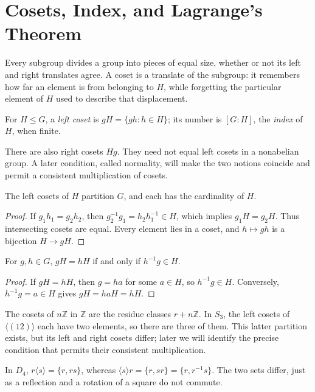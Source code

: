 \section{Cosets, Index, and Lagrange's Theorem}

Every subgroup divides a group into pieces of equal size, whether or not its
left and right translates agree.  A coset is a translate of the subgroup: it remembers
how far an element is from belonging to \(H\), while forgetting the particular
element of \(H\) used to describe that displacement.

For \(H\leq G\), a \emph{left coset} is \(gH=\{gh:h\in H\}\); its number is
\([G:H]\), the \emph{index} of \(H\), when finite.

There are also right cosets \(Hg\).  They need not equal left cosets in a
nonabelian group.  A later condition, called normality, will make the two
notions coincide and permit a consistent multiplication of cosets.

\begin{lemma}
The left cosets of \(H\) partition \(G\), and each has the cardinality of
\(H\).
\end{lemma}
\begin{proof}
If \(g_1h_1=g_2h_2\), then \(g_2^{-1}g_1=h_2h_1^{-1}\in H\), which implies
\(g_1H=g_2H\).  Thus intersecting cosets are equal.  Every element lies in a
coset, and \(h\mapsto gh\) is a bijection \(H\to gH\).
\end{proof}

\begin{proposition}
For \(g,h\in G\), \(gH=hH\) if and only if \(h^{-1}g\in H\).
\end{proposition}
\begin{proof}
If \(gH=hH\), then \(g=ha\) for some \(a\in H\), so \(h^{-1}g\in H\).
Conversely, \(h^{-1}g=a\in H\) gives \(gH=haH=hH\).
\end{proof}

\begin{example}
The cosets of \(n\mathbb Z\) in \(\mathbb Z\) are the residue classes
\(r+n\mathbb Z\).  In \(S_3\), the left cosets of \(\langle(12)\rangle\) each
have two elements, so there are three of them.  This latter partition exists,
but its left and right cosets differ; later we will identify the precise
condition that permits their consistent multiplication.
\end{example}

\begin{example}
In \(D_4\), \(r\langle s\rangle=\{r,rs\}\), whereas
\(\langle s\rangle r=\{r,sr\}=\{r,r^{-1}s\}\).  The two sets differ, just as
a reflection and a rotation of a square do not commute.
\end{example}

